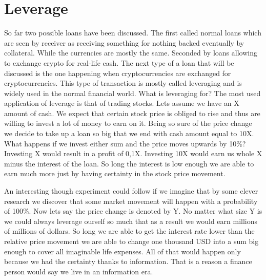 \documentclass[a4paper,12pt,twoside,openany]{report}
\begin{document}
\section{Leverage}
So far two possible loans have been discussed. The first called normal loans which are seen by receiver as receiving something for nothing backed eventually by collateral. While the currencies are mostly the same.  Seconded by loans allowing to exchange crypto for real-life cash. The next type of a loan that will be discussed is the one happening when cryptocurrencies are exchanged for cryptocurrencies. This type of transaction is mostly called leveraging and is widely used in the normal financial world. What is leveraging for? The most used application of leverage is that of trading stocks. Lets assume we have an X amount of cash. We expect that certain stock price is obliged to rise and thus are willing to invest a lot of money to earn on it. Being so sure of the price change we decide to take up a loan so big that we end with cash amount equal to 10X. What happens if we invest either sum and the price moves upwards by 10\%? Investing X would result in a profit of 0,1X. Investing 10X would earn us whole X minus the interest of the loan. So long the interest is low enough we are able to earn much more just by having certainty in the stock price movement.

An interesting though experiment could follow if we imagine that by some clever research we discover that some market movement will happen with a probability of 100\%. Now lets say the price change is denoted by Y. No matter what size Y is we could always leverage ourself so much that as a result we would earn millions of millions of dollars. So long we are able to get the interest rate lower than the relative price movement we are able to change one thousand USD into a sum big enough to cover all imaginable life expenses. All of that would happen only because we had the certainty thanks to information. That is a reason a finance person would say we live in an information era.
\end{document}
